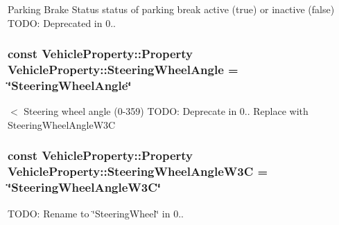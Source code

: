 Parking Brake Status status of parking break active (true) or inactive (false) T\+O\+D\+O\+: Deprecated in 0.. \hypertarget{classVehicleProperty_aba4832663e4f850acbcf09c7cfbc6959}{
\subsubsection[{Steering\+Wheel\+Angle}]{\setlength{\rightskip}{0pt plus 5cm}const Vehicle\+Property\+::\+Property Vehicle\+Property\+::\+Steering\+Wheel\+Angle = \char`\"{}Steering\+Wheel\+Angle\char`\"{}\hspace{0.3cm}{\ttfamily [static]}}}\label{classVehicleProperty_aba4832663e4f850acbcf09c7cfbc6959}
$<$ Steering wheel angle (0-\/359) T\+O\+D\+O\+: Deprecate in 0.. Replace with Steering\+Wheel\+Angle\+W3\+C \hypertarget{classVehicleProperty_afb3708166c9863053de47a7dfcd0a09e}{
\subsubsection[{Steering\+Wheel\+Angle\+W3\+C}]{\setlength{\rightskip}{0pt plus 5cm}const Vehicle\+Property\+::\+Property Vehicle\+Property\+::\+Steering\+Wheel\+Angle\+W3\+C = \char`\"{}Steering\+Wheel\+Angle\+W3\+C\char`\"{}\hspace{0.3cm}{\ttfamily [static]}}}\label{classVehicleProperty_afb3708166c9863053de47a7dfcd0a09e}


T\+O\+D\+O\+: Rename to \char`\"{}\+Steering\+Wheel\char`\"{} in 0.. 

